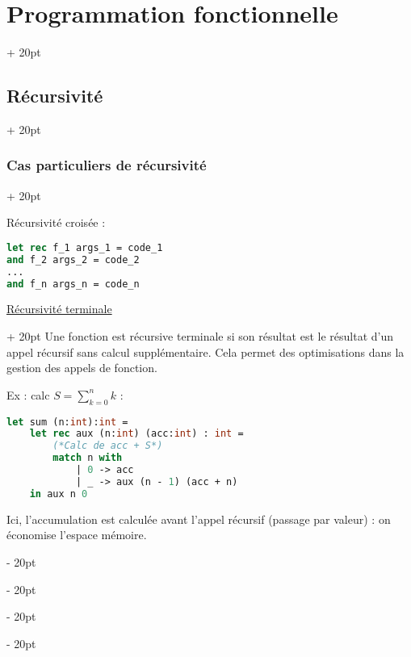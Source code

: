 \documentclass[a4paper, 12pt, twoside]{article}
\newcommand{\ind}[1][20pt]{\advance\leftskip + #1}
\newcommand{\deind}[1][20pt]{\advance\leftskip - #1}
\newenvironment{indentedenv}[1][20pt]{\par \ind[#1]}{\par \deind}
\newenvironment{indt}[2][20pt]{#2 \begin{indentedenv}[#1]}{\end{indentedenv}} %
\begin{document}
\begin{indt}{\section{Programmation fonctionnelle}}
\begin{indt}{\subsection{Récursivité}}
            \vspace{12pt}
            
            \begin{indt}{\subsubsection{Cas particuliers de récursivité}}
                
                Récursivité croisée :
                
                \begin{lstlisting}[language=Caml, xleftmargin=80pt]
let rec f_1 args_1 = code_1
and f_2 args_2 = code_2
...
and f_n args_n = code_n
                \end{lstlisting}
                
                \vspace{6pt}
                
                \begin{indt}{\underline{Récursivité terminale}}
                    Une fonction est récursive terminale si son résultat est le résultat d’un appel récursif sans calcul supplémentaire. Cela permet des optimisations dans la gestion des appels de fonction.
                    
                    Ex : calc $\displaystyle S = \sum_{k = 0}^n k$ :
                    
                    \begin{lstlisting}[language=Caml, xleftmargin=100pt]
let sum (n:int):int =
    let rec aux (n:int) (acc:int) : int =
        (*Calc de acc + S*)
        match n with
            | 0 -> acc
            | _ -> aux (n - 1) (acc + n)
    in aux n 0
                    \end{lstlisting}
                    
                    Ici, l’accumulation est calculée avant l’appel récursif (passage par valeur) : on économise l’espace mémoire.
                \end{indt}
                
            \end{indt}
            
        \end{indt}
        
    \end{indt}
    
\end{document}
